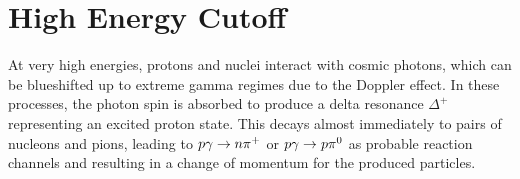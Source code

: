\newpage



\section{High Energy Cutoff}
\label{sec:cutoff}

At very high energies, protons and nuclei interact with cosmic photons, which can be blueshifted up to extreme gamma regimes due to
the Doppler effect. In these processes, the photon spin is absorbed to produce a delta resonance $\Delta^+$ representing an excited
proton state. This decays almost immediately to pairs of nucleons and pions, leading to $p\gamma \rightarrow \kern-0.1pt n\smash{\pi^+}$
or $p\gamma \rightarrow \kern+0.2pt p \smash{\pi^0}$ as probable reaction channels and resulting in a change of momentum for the
produced particles.

